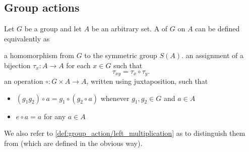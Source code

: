 \subsection{Group actions}\label{subsec:group_actions}

\begin{definition}\label{def:group_action}\cite[159]{Knapp2016BAlg}
  Let \( G \) be a group and let \( A \) be an arbitrary set. A  of \( G \) on \( A \) can be defined equivalently as
  \begin{defenum}
     a homomorphism from \( G \) to the symmetric group \( S(A) \).
     an assignment of a bijection \( \tau_x: A \to A \) for each \( x \in G \) such that
    \begin{equation*}
      \tau_{xy} = \tau_x \circ \tau_y.
    \end{equation*}
     an operation \( \circ: G \times A \to A \), written using juxtaposition, such that
    \begin{itemize}
      \item \( (g_1 g_2) \circ a = g_1 \circ (g_2 \circ a) \) whenever \( g_1, g_2 \in G \) and \( a \in A \)
      \item \( e \circ a = a \) for any \( a \in A \)
    \end{itemize}
  \end{defenum}

  We also refer to \ref{def:group_action/left_multiplication} as  to distinguish them from  (which are defined in the obvious way).
\end{definition}

